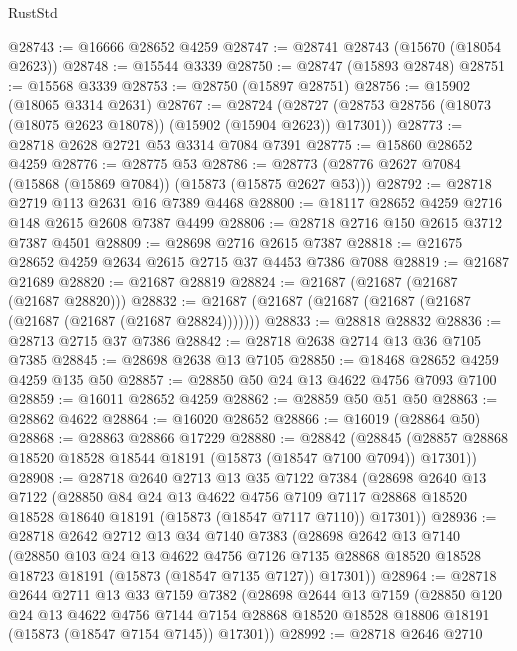\begin{lexlean}{RustStd}
\begin{coremodule}
@28743 := @16666 @28652 @4259
@28747 := @28741 @28743 (@15670 (@18054 @2623))
@28748 := @15544 @3339
@28750 := @28747 (@15893 @28748)
@28751 := @15568 @3339
@28753 := @28750 (@15897 @28751)
@28756 := @15902 (@18065 @3314 @2631)
@28767 := @28724
    (@28727 (@28753 @28756 (@18073 (@18075 @2623 @18078)) (@15902 (@15904 @2623)) @17301))
@28773 := @28718 @2628 @2721 @53 @3314 @7084 @7391
@28775 := @15860 @28652 @4259
@28776 := @28775 @53
@28786 := @28773 (@28776 @2627 @7084 (@15868 (@15869 @7084)) (@15873 (@15875 @2627 @53)))
@28792 := @28718 @2719 @113 @2631 @16 @7389 @4468
@28800 := @18117 @28652 @4259 @2716 @148 @2615 @2608 @7387 @4499
@28806 := @28718 @2716 @150 @2615 @3712 @7387 @4501
@28809 := @28698 @2716 @2615 @7387
@28818 := @21675 @28652 @4259 @2634 @2615 @2715 @37 @4453 @7386 @7088
@28819 := @21687 @21689
@28820 := @21687 @28819
@28824 := @21687 (@21687 (@21687 (@21687 @28820)))
@28832 := @21687 (@21687 (@21687 (@21687 (@21687 (@21687 (@21687 (@21687 @28824)))))))
@28833 := @28818 @28832
@28836 := @28713 @2715 @37 @7386
@28842 := @28718 @2638 @2714 @13 @36 @7105 @7385
@28845 := @28698 @2638 @13 @7105
@28850 := @18468 @28652 @4259 @4259 @135 @50
@28857 := @28850 @50 @24 @13 @4622 @4756 @7093 @7100
@28859 := @16011 @28652 @4259
@28862 := @28859 @50 @51 @50
@28863 := @28862 @4622
@28864 := @16020 @28652
@28866 := @16019 (@28864 @50)
@28868 := @28863 @28866 @17229
@28880 := @28842
    (@28845 (@28857 @28868 @18520 @18528 @18544 @18191 (@15873 (@18547 @7100 @7094)) @17301))
@28908 := @28718
    @2640
    @2713
    @13
    @35
    @7122
    @7384
    (@28698
      @2640
      @13
      @7122
      (@28850
        @84
        @24
        @13
        @4622
        @4756
        @7109
        @7117
        @28868
        @18520
        @18528
        @18640
        @18191
        (@15873 (@18547 @7117 @7110))
        @17301))
@28936 := @28718
    @2642
    @2712
    @13
    @34
    @7140
    @7383
    (@28698
      @2642
      @13
      @7140
      (@28850
        @103
        @24
        @13
        @4622
        @4756
        @7126
        @7135
        @28868
        @18520
        @18528
        @18723
        @18191
        (@15873 (@18547 @7135 @7127))
        @17301))
@28964 := @28718
    @2644
    @2711
    @13
    @33
    @7159
    @7382
    (@28698
      @2644
      @13
      @7159
      (@28850
        @120
        @24
        @13
        @4622
        @4756
        @7144
        @7154
        @28868
        @18520
        @18528
        @18806
        @18191
        (@15873 (@18547 @7154 @7145))
        @17301))
@28992 := @28718
    @2646
    @2710

\end{coremodule}
\end{lexlean}
